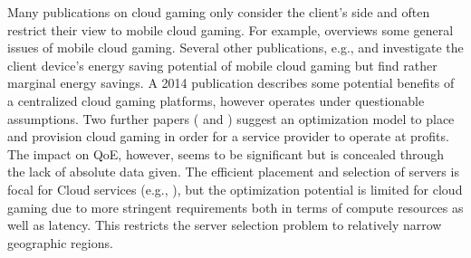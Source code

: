 Many publications on cloud gaming only consider the client's side and often restrict their view to mobile cloud gaming. For example, \cite{Soliman2013} overviews some general issues of mobile cloud gaming. Several other publications, e.g., \cite{6924295} and \cite{Huang:2014:MCP:2755535.2755542} investigate the client device's energy saving potential of mobile cloud gaming but find rather marginal energy savings. A 2014 publication \cite{6882299} describes some potential benefits of a centralized cloud gaming platforms, however operates under questionable assumptions. Two further papers (\cite{6853364} and \cite{6365107}) suggest an optimization model to place and provision cloud gaming  in order for a service provider to operate at profits. The impact on \gls{QoE}, however, seems to be significant but is concealed through the lack of absolute data given. The efficient placement and selection of servers is focal for Cloud services (e.g., \cite{6740249}), but the optimization potential is limited for cloud gaming due to more stringent requirements both in terms of compute resources as well as latency. This restricts the server selection problem to relatively narrow geographic regions.











